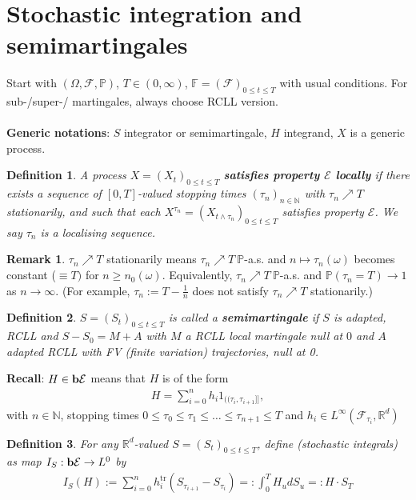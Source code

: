 \documentclass[12pt,a4paper, twoside]{article}
\newtheorem{defn}{Definition}[section]
\theoremstyle{definition}
\newtheorem{rem}{Remark}[section]
\newcommand{\PP}{\mathbb{P}} %
\newcommand{\simple}{\textbf{\text{b}}\mathcal{E}}
\begin{document}
\section{Stochastic integration and semimartingales}
Start with $( \Omega, \mathcal{F}, \PP)$, $T \in (0, \infty)$, $\mathbb{F}=(\mathcal{F})_{0 \leq t \leq T}$ with usual conditions. For sub-/super-/ martingales, always choose RCLL version. 
\\\\
\textbf{Generic notations}: $S$ integrator or semimartingale, $H$ integrand, $X$ is a generic process. 
\begin{defn} A process $X=(X_t)_{0 \leq t \leq T}$ \textbf{satisfies property $\mathcal{E}$ locally} if there exists a sequence of $[0,T]$-valued stopping times $( \tau_n)_{n \in \mathbb{N}}$ with $\tau_n \nearrow T$ stationarily, and such that each $X^{\tau_n}= (X_{t \wedge \tau_n})_{0 \leq t \leq T}$ satisfies property $\mathcal{E}$. We say $\tau_n$ is a localising sequence. 
\end{defn}
\begin{rem} $\tau_n \nearrow T$ stationarily means $\tau_n \nearrow T \ \PP$-a.s. and $n \mapsto \tau_n( \omega)$ becomes constant ($\equiv T)$ for $n \geq n_0( \omega)$. Equivalently, $\tau_n \nearrow T \ \PP$-a.s. and $\PP( \tau_n=T) \to 1$ as $n \to \infty$. (For example, $\tau_n := T- \frac{1}{n}$ does not satisfy $\tau_n \nearrow T$ stationarily.) 
\end{rem}
\begin{defn} $S=(S_t)_{0 \leq t \leq T}$ is called a \textbf{semimartingale} if $S$ is adapted, RCLL and $S-S_0=M+A$ with $M$ a RCLL local martingale null at $0$ and $A$ adapted RCLL with FV (finite variation) trajectories, null at 0. 
\end{defn}
\textbf{Recall}: $H \in \simple$ means that $H$ is of the form 
\begin{align*}
H = \sum_{i=0}^n h_i 1_{(\!( \tau_i, \tau_{i+1} ]\!]},
\end{align*}
with $n \in \mathbb{N}$,  stopping times $0 \leq \tau_0 \leq \tau_1 \leq \dots \leq \tau_{n+1} \leq T$ and $h_i \in L^\infty ( \mathcal{F}_{\tau_i}, \mathbb{R}^d)$
\begin{defn} For any $\mathbb{R}^d$-valued $S= (S_t)_{0 \leq t \leq T}$, define (stochastic integrals) as map $I_S: \simple \to L^0$ by
\begin{align*}
I_S(H):= \sum_{i=0}^n h_i^\text{tr} (S_{\tau_{i+1}}-S_{\tau_i}) =: \int_0^T H_u dS_u =: H \cdot S_T
\end{align*} 
\end{defn}
\end{document}
